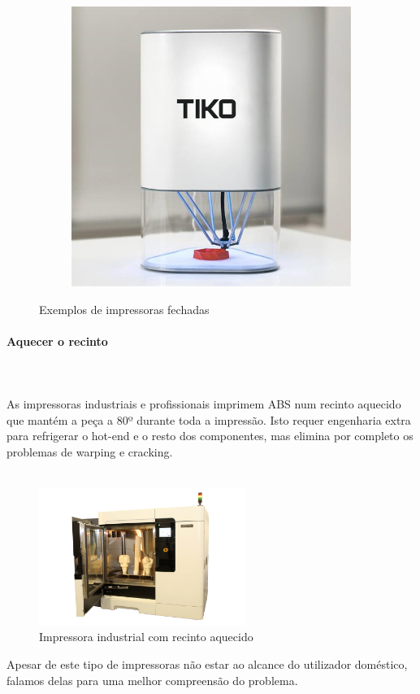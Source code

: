 \documentclass[11pt,a4paper]{article}
\begin{document}
\begin{figure}[H]
\begin{subfigure}[b]{0.3\textwidth}
        \includegraphics[width=\textwidth,cfbox=azul_marcos 4pt 0pt]{FOTOS/IMPRESORACERRADA3}
    \end{subfigure}
    \caption*{Exemplos de impressoras fechadas}
\end{figure}
			\paragraph{Aquecer o recinto}\mbox{}\\\\
As impressoras industriais e profissionais imprimem ABS num recinto aquecido que mantém a peça a 80º durante toda a impressão. Isto requer engenharia extra para refrigerar o hot-end e o resto dos componentes, mas elimina por completo os problemas de warping e cracking.
\\\\
\begin{figure}[H]
\centering
\includegraphics[width=0.6\textwidth,cfbox=azul_marcos 4pt 0pt]{FOTOS/STRATASYS}
\caption*{Impressora industrial com recinto aquecido}
\end{figure}
Apesar de este tipo de impressoras não estar ao alcance do utilizador doméstico, falamos delas para uma melhor compreensão do problema.
\end{document}
